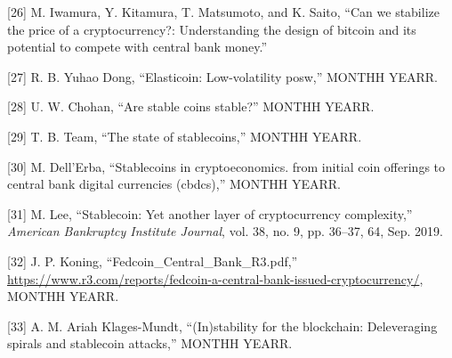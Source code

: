\documentclass[english,]{IEEEtran}
\begin{document}
\hypertarget{ref-CanWeStabilize}{}
{[}26{]} M. Iwamura, Y. Kitamura, T. Matsumoto, and K. Saito, ``Can we
stabilize the price of a cryptocurrency?: Understanding the design of
bitcoin and its potential to compete with central bank money.''

\hypertarget{ref-Elasticoin_Low-Volatility_PoSW}{}
{[}27{]} R. B. Yuhao Dong, ``Elasticoin: Low-volatility posw,'' MONTHH
YEARR.

\hypertarget{ref-Are_Stable_Coins_Stable}{}
{[}28{]} U. W. Chohan, ``Are stable coins stable?'' MONTHH YEARR.

\hypertarget{ref-THE_STATE_OF_STABLECOINS}{}
{[}29{]} T. B. Team, ``The state of stablecoins,'' MONTHH YEARR.

\hypertarget{ref-Stablecoins_in_Cryptoeconomics}{}
{[}30{]} M. Dell'Erba, ``Stablecoins in cryptoeconomics. from initial
coin offerings to central bank digital currencies (cbdcs),'' MONTHH
YEARR.

\hypertarget{ref-Stablecoin:_Yet_Another_Layer_of_Cryptocurrency_Complexity}{}
{[}31{]} M. Lee, ``Stablecoin: Yet another layer of cryptocurrency
complexity,'' \emph{American Bankruptcy Institute Journal}, vol. 38, no.
9, pp. 36--37, 64, Sep. 2019.

\hypertarget{ref-Fedcoin}{}
{[}32{]} J. P. Koning, ``Fedcoin\_Central\_Bank\_R3.pdf,''
\url{https://www.r3.com/reports/fedcoin-a-central-bank-issued-cryptocurrency/},
MONTHH YEARR.

\hypertarget{ref-In_stability_for_the_Blockchain}{}
{[}33{]} A. M. Ariah Klages-Mundt, ``(In)stability for the blockchain:
Deleveraging spirals and stablecoin attacks,'' MONTHH YEARR.
\end{document}
